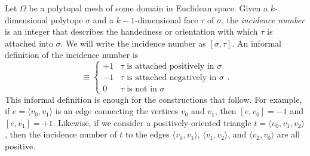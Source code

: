 \documentclass[twocolumn]{article}
\begin{document}
Let $\Omega$ be a polytopal mesh of some domain in Euclidean space.
Given a $k$-dimensional polytope $\sigma$ and a $k - 1$-dimensional face $\tau$ of $\sigma$, the \emph{incidence number} is an integer that describes the handedness or orientation with which $\tau$ is attached into $\sigma$.
We will write the incidence number as $[\sigma, \tau]$.
An informal definition of the incidence number is
\begin{equation}
    [\sigma, \tau] \equiv \begin{cases} +1 & \tau\text{ is attached positively in }\sigma \\ -1 & \tau\text{ is attached negatively in }\sigma \\ 0 & \tau\text{ is not in }\sigma\end{cases}.
\end{equation}
This informal definition is enough for the constructions that follow.
For example, if $e = \langle v_0, v_1\rangle$ is an edge connecting the vertices $v_0$ and $v_1$, then $[e, v_0] = -1$ and $[e, v_1] = +1$.
Likewise, if we consider a positively-oriented triangle $t = \langle v_0, v_1, v_2\rangle$, then the incidence number of $t$ to the edges $\langle v_0, v_1\rangle$, $\langle v_1, v_2\rangle$, and $\langle v_2, v_0\rangle$ are all positive.
\end{document}
